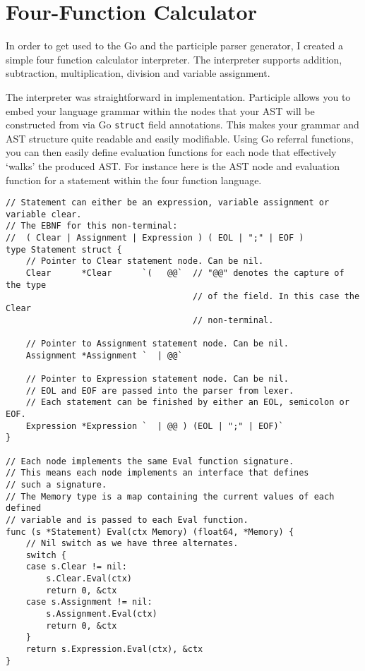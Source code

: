 \section{Four-Function Calculator}
\label{sec:four-func-calculator}

In order to get used to the Go and the participle parser generator, I created a simple four function calculator interpreter. The interpreter supports addition, subtraction, multiplication, division and variable assignment.

The interpreter was straightforward in implementation. Participle allows you to embed your language grammar within the nodes that your AST will be constructed from via Go \verb|struct| field annotations. This makes your grammar and AST structure quite readable and easily modifiable. Using Go referral functions, you can then easily define evaluation functions for each node that effectively `walks' the produced AST. For instance here is the AST node and evaluation function for a statement within the four function language.

\begin{verbatim}
// Statement can either be an expression, variable assignment or variable clear.
// The EBNF for this non-terminal:
//  ( Clear | Assignment | Expression ) ( EOL | ";" | EOF )
type Statement struct {
    // Pointer to Clear statement node. Can be nil.
    Clear      *Clear      `(   @@`  // "@@" denotes the capture of the type 
                                     // of the field. In this case the Clear
                                     // non-terminal.

    // Pointer to Assignment statement node. Can be nil.
    Assignment *Assignment `  | @@`

    // Pointer to Expression statement node. Can be nil.
    // EOL and EOF are passed into the parser from lexer.
    // Each statement can be finished by either an EOL, semicolon or EOF.
    Expression *Expression `  | @@ ) (EOL | ";" | EOF)`
}

// Each node implements the same Eval function signature.
// This means each node implements an interface that defines
// such a signature.
// The Memory type is a map containing the current values of each defined
// variable and is passed to each Eval function.
func (s *Statement) Eval(ctx Memory) (float64, *Memory) {
    // Nil switch as we have three alternates.
    switch {
    case s.Clear != nil:
        s.Clear.Eval(ctx)
        return 0, &ctx
    case s.Assignment != nil:
        s.Assignment.Eval(ctx)
        return 0, &ctx
    }
    return s.Expression.Eval(ctx), &ctx
}
\end{verbatim}

